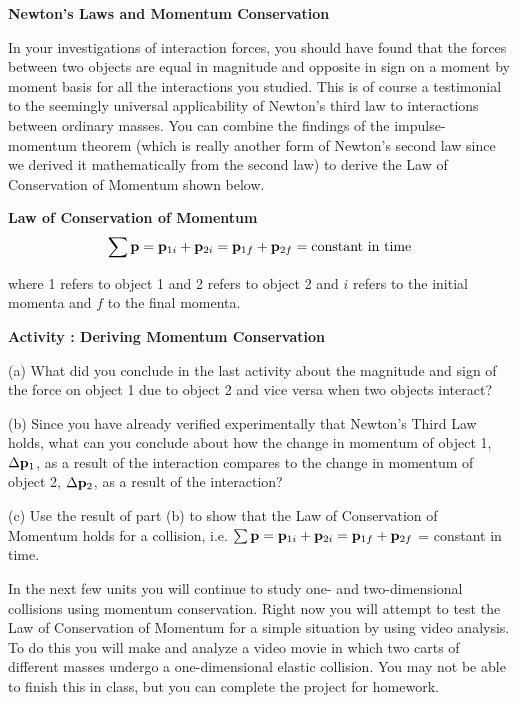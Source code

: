 \textbf{Newton's Laws and Momentum Conservation} 

In your investigations of interaction forces, you should have found that the
forces between two objects are equal in magnitude and opposite in sign on a
moment by moment basis for all the interactions you studied. This is of course
a testimonial to the seemingly universal applicability of Newton's third law
to interactions between ordinary masses. You can combine the findings of the
impulse-momentum theorem (which is really another form of Newton's second law
since we derived it mathematically from the second law) to derive the Law of
Conservation of Momentum shown below.

{\par\centering \textbf{Law of Conservation of Momentum}
\[
\sum {\bf p}={{\bf p}_{1i}}+{{\bf p}_{2i}}={{\bf p}_{1f}}+{{\bf p}_{2f}}=
\mbox{constant in time}\]
\par}

where 1 refers to object 1 and 2 refers to object 2 and $i$ refers to the initial
momenta and $f$ to the final momenta.

\textbf{Activity : Deriving Momentum Conservation }

(a) What did you conclude in the last activity about the magnitude and sign
of the force on object 1 due to object 2 and vice versa when two objects interact?
\vspace{10mm}

(b) Since you have already verified experimentally that Newton's Third Law
holds, what can you conclude about how the change in momentum of object
1, \( \Delta {{\bf p}_{1}} \), as a result of the interaction compares
to the change in momentum of object 2, \( \Delta {{\bf p}_{2}} \),
as a result of the interaction? 
\vspace{25mm}

(c) Use the result of part (b) to show that the Law of Conservation
of Momentum holds for a collision, i.e. \( \sum {\bf p} 
=  {{\bf p}_{1i}}  + {{\bf p}_{2i}}  = {{\bf p}_{1f}} 
+ {{\bf p}_{2f}} \) = constant in time.
\vspace{20mm}

In the next few units you will continue to study one- and two-dimensional collisions
using momentum conservation. Right now you will attempt to test the Law of Conservation
of Momentum for a simple situation by using video analysis. To do this you will
make and analyze a video movie in which two carts of different masses undergo
a one-dimensional elastic collision. You may not be able to finish this in class,
but you can complete the project for homework.

